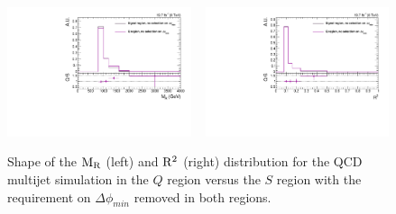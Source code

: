 \begin{figure}[htbp]
\centering
\includegraphics[width=0.48\textwidth]
{figures/razor_selection/shapeplots/MR_comparison_QCD_SIG_no_deltaphimin}
~
\includegraphics[width=0.48\textwidth]
{figures/razor_selection/shapeplots/R2_comparison_QCD_SIG_no_deltaphimin}
\caption{Shape of the $\mathrm{M_R}$ (left) and $\mathrm{R^2}$ (right) distribution for the QCD multijet simulation
in the $Q$ region versus the $S$ region with the requirement on  $\Delta\phi_{min}$ removed in both
regions. 
\label{fig:Shape_QCD_QvsS_nomdphi}}
\end{figure}



